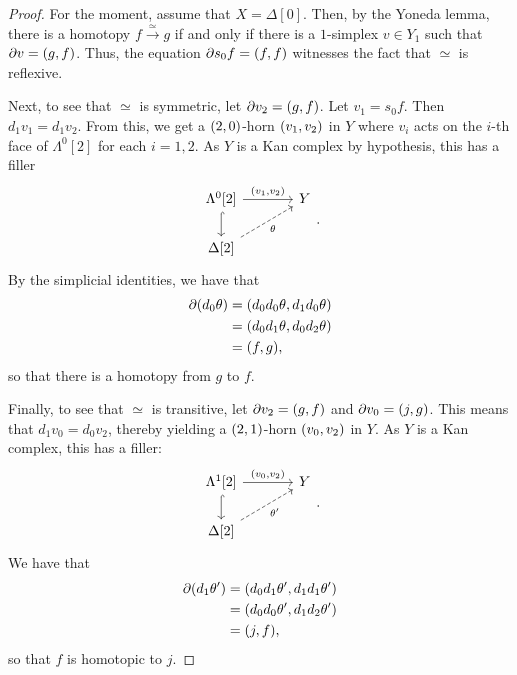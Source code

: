 \documentclass[10pt,letterpaper,cm]{nupset}
\theoremstyle{definition}
\theoremstyle{theorem}
\theoremstyle{remark}
\newcommand{\0}{\mathbf{0}}
\newcommand{\1}{\mathbf{1}}
\newcommand{\2}{\mathbf{2}}
\begin{document}
\begin{proof}
For the moment, assume that $X = \Delta[0]$. Then, by the Yoneda lemma, there is a homotopy $f \overset{\simeq}{\longrightarrow} g$ if and only if there is a $1$-simplex $v\in Y_1$ such that $\partial{v} = \mleft(g, f\mright)$. Thus, the equation $\partial{s_0{f}} = \mleft(f, f\mright)$ witnesses the fact that ${}\simeq{}$ is reflexive.

\medskip

Next, to see that ${}\simeq{}$  is symmetric, let $\partial{v_2} = \mleft(g,f\mright)$. Let $v_1 = s_0{f}$. Then $d_1{v_1} = d_1{v_2}$. From this, we get a $\mleft(2,0\mright)$-horn $\mleft(v_1, v_2\mright)$  in $Y$ where $v_i$ acts on the $i$-th face of $ \Lambda^0[2]$ for each $i=1,2$. As $Y$ is a Kan complex by hypothesis, this has a filler
\[
\begin{tikzcd}[column sep=large]
{\Lambda^0[2]} \arrow[d, hook] \arrow[r, "{\mleft(v_1, v_2\mright)}"] & Y \\
{\Delta[2]} \arrow[ru, "\theta"', dashed]                          &  
\end{tikzcd}
.\] By the simplicial identities, we have that 
\begin{align*}
\partial\mleft(d_{0} \theta\mright) &=\mleft(d_{0} d_{0} \theta, d_{1} d_{0} \theta\mright) \\
&=\mleft(d_{0} d_{1} \theta, d_{0} d_{2} \theta\mright) \\
&=\mleft(f, g\mright)
,\end{align*} so that there is a homotopy from $g$ to $f$.

\medskip

Finally, to see that ${}\simeq{}$  is transitive, let $\partial{v_2} = \mleft(g,f\mright)$ and $\partial{v_0} = \mleft(j, g\mright)$. This means that $d_1{v_0} = d_0{v_2}$, thereby yielding a $\mleft(2,1\mright)$-horn $\mleft(v_0, v_2\mright)$ in  $Y$. As $Y$ is a Kan complex, this has a filler:
\[
\begin{tikzcd}[column sep=large]
{\Lambda^1[2]} \arrow[d, hook] \arrow[r, "{\mleft(v_0, v_2\mright)}"] & Y \\
{\Delta[2]} \arrow[ru, "\theta'"', dashed]                           &  
\end{tikzcd}
.\] We have that
\begin{align*}
\partial\mleft(d_{1} \theta'\mright) &=\mleft(d_{0} d_{1} \theta', d_{1} d_{1} \theta'\mright) \\
&=\mleft(d_{0} d_{0} \theta', d_{1} d_{2} \theta'\mright) \\
&=\mleft(j, f\mright),
\end{align*} so that $f$ is homotopic to $j$.


\end{proof}
\end{document}
